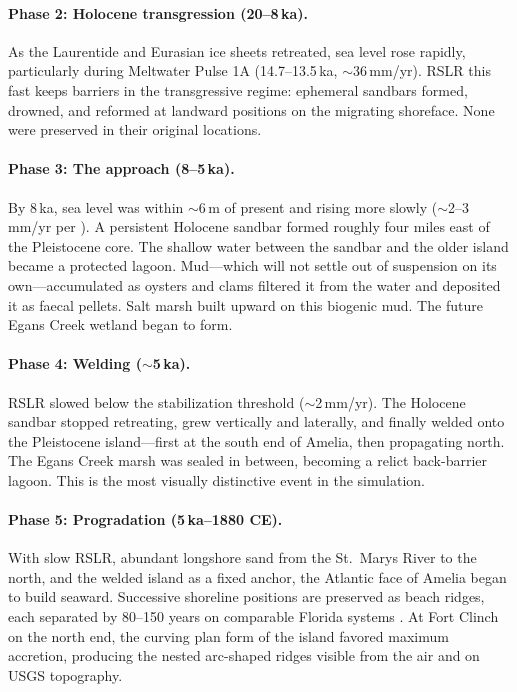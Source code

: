 \documentclass[11pt]{article}
\begin{document}
\paragraph{Phase 2: Holocene transgression (20--8\,ka).}
As the Laurentide and Eurasian ice sheets retreated, sea level rose rapidly,
particularly during Meltwater Pulse 1A (14.7--13.5\,ka, $\sim$36\,mm/yr). RSLR
this fast keeps barriers in the transgressive regime: ephemeral sandbars formed,
drowned, and reformed at landward positions on the migrating shoreface. None
were preserved in their original locations.

\paragraph{Phase 3: The approach (8--5\,ka).}
By 8\,ka, sea level was within $\sim$6\,m of present and rising more slowly
($\sim$2--3\,mm/yr per \cite{hawkes2016}). A persistent Holocene sandbar formed
roughly four miles east of the Pleistocene core. The shallow water between the
sandbar and the older island became a protected lagoon. Mud---which will not
settle out of suspension on its own---accumulated as oysters and clams filtered
it from the water and deposited it as faecal pellets. Salt marsh built upward
on this biogenic mud. The future Egans Creek wetland began to form.

\paragraph{Phase 4: Welding ($\sim$5\,ka).}
RSLR slowed below the stabilization threshold ($\sim$2\,mm/yr). The Holocene
sandbar stopped retreating, grew vertically and laterally, and finally welded
onto the Pleistocene island---first at the south end of Amelia, then propagating
north. The Egans Creek marsh was sealed in between, becoming a relict back-barrier
lagoon. This is the most visually distinctive event in the simulation.

\paragraph{Phase 5: Progradation (5\,ka--1880 CE).}
With slow RSLR, abundant longshore sand from the St.\ Marys River to the north,
and the welded island as a fixed anchor, the Atlantic face of Amelia began to
build seaward. Successive shoreline positions are preserved as beach ridges,
each separated by 80--150 years on comparable Florida systems
\cite{rink2008,forrest2007}. At Fort Clinch on the north end, the curving plan
form of the island favored maximum accretion, producing the nested arc-shaped
ridges visible from the air and on USGS topography.
\end{document}
